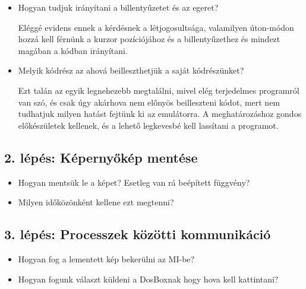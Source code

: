 \begin{itemize}
    \item Hogyan tudjuk irányítani a billentyűzetet és az egeret?
    
    Eléggé evidens ennek a kérdésnek a létjogosultsága, valamilyen úton-módon hozzá kell férnünk a kurzor pozíciójához és a billentyűzethez és mindezt magában a kódban irányítani.  
    \item Melyik kódrész az ahová beilleszthetjük a saját kódrészünket?
    
    Ezt talán az egyik legnehezebb megtalálni, mivel elég terjedelmes programról van szó, és csak úgy akárhova nem előnyös beilleszteni kódot, mert nem tudhatjuk milyen hatást fejtünk ki az emulátorra. A meghatározáshoz gondos előkészületek kellenek, és a lehető legkevesbé kell lassítani a programot.
\end{itemize}

\subsection{2. lépés: Képernyőkép mentése}

\begin{itemize}
    \item Hogyan mentsük le a képet? Esetleg van rá beépített függvény?
    
    
    \item Milyen időközönként kellene ezt megtenni?
\end{itemize}

\subsection{3. lépés: Processzek közötti kommunikáció}

\begin{itemize}
    \item Hogyan fog a lementett kép bekerülni az MI-be?
    \item Hogyan fogunk választ küldeni a DosBoxnak hogy hova kell kattintani?
\end{itemize}




